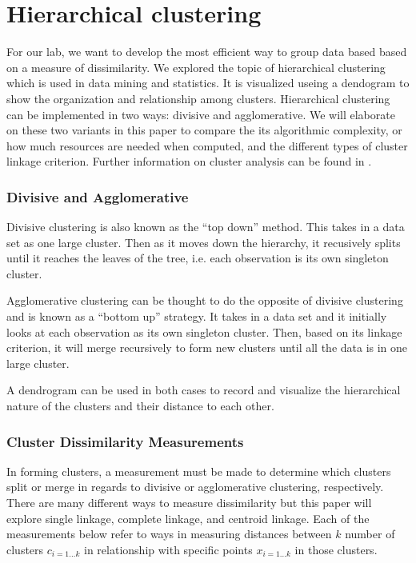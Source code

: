 \documentclass[../tech_report_1.tex]{subfiles}
\begin{document}
\part*{Hierarchical clustering}

For our lab, we want to develop the most efficient way to group data
based based on a measure of dissimilarity. We explored the topic of
hierarchical clustering which is used in data mining and statistics.
It is visualized useing a dendogram to show the organization and relationship
among clusters. Hierarchical clustering can be implemented in two
ways: divisive and agglomerative. We will elaborate on these two variants
in this paper to compare the its algorithmic complexity, or how much
resources are needed when computed, and the different types of cluster
linkage criterion. Further information on cluster analysis can be
found in \cite{ClusterAnalysis}.

\section*{Divisive and Agglomerative}

Divisive clustering is also known as the ``top down'' method. This takes
in a data set as one large cluster. Then as it moves down the hierarchy,
it recusively splits until it reaches the leaves of the tree, i.e. each
observation is its own singleton cluster.

Agglomerative clustering can be thought to do the opposite of divisive
clustering and is known as a ``bottom up'' strategy. It takes in
a data set and it initially looks at each observation as its own singleton
cluster. Then, based on its linkage criterion, it will merge recursively
to form new clusters until all the data is in one large cluster.

A dendrogram can be used in both cases to record and visualize the hierarchical nature of the
clusters and their distance to each other.


\section*{Cluster Dissimilarity Measurements}

In forming clusters, a measurement must be made to determine which
clusters split or merge in regards to divisive or agglomerative clustering,
respectively. There are many different ways to measure dissimilarity
but this paper will explore single linkage, complete linkage, and
centroid linkage. Each of the measurements below refer to ways in
measuring distances between $k$ number of clusters $c_{i=1\dots k}$
in relationship with specific points $x_{i=1\dots k}$ in those clusters.
\end{document}
